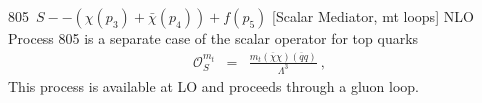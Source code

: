 
805~$ S--({\chi}(p_3)+\bar{\chi}(p_4)) +f(p_5)$ [Scalar Mediator, mt loops]  NLO\\
Process 805 is a separate case of the scalar operator for top quarks
\begin{eqnarray}
\mathcal{O}^{m_t}_S&=&\frac{m_t(\overline{\chi}\chi)(\overline{q}q)}{\Lambda^3}~,
\end{eqnarray}
This process is available at LO and proceeds through a gluon loop. 
